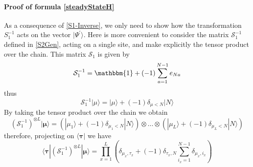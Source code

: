 \documentclass[10pt]{article}
\numberwithin{equation}{section}
\numberwithin{equation}{subsection}
\begin{document}
	\paragraph{Proof of formula \eqref{steadyStateH}} As a consequence of \eqref{S1-Inverse}, we only need to show how the transformation $S_{1}^{-1}$ acts on the vector $|\Psi^{'}\rangle$. Here is more convenient to consider the matrix $\mathcal{S}_{1}^{-1}$ defined in \eqref{S2Gen}, acting on a single site, and make explicitly the tensor product over the chain. This matrix $\mathcal{S}_{1}$ is given by
	\begin{equation}\label{S1-L1}
		\mathcal{S}_{1}^{-1}=\mathbbm{1}+(-1)\sum_{a=1}^{N-1}e_{Na}
	\end{equation}
thus
\begin{equation}
\mathcal{S}_{1}^{-1}|\mu\rangle=|\mu\rangle+(-1)\delta_{\mu<N}|N\rangle
\end{equation}
By taking the tensor product over the chain we obtain 
\begin{equation}
	\left(\mathcal{S}_{1}^{-1}\right)^{\otimes L}|\bm{\mu}\rangle=\left(|\mu_{1}\rangle+(-1)\delta_{\mu_{1}<N}|N\rangle\right)\otimes \ldots \otimes \left(|\mu_{L}\rangle+(-1)\delta_{\mu_{L}<N}|N\rangle\right)
\end{equation}
therefore, projecting on $\langle \bm{\tau}|$ we have
\begin{equation}
	\langle \bm{\tau}|	\left(\mathcal{S}_{1}^{-1}\right)^{\otimes L}|\bm{\mu}\rangle=\prod_{x=1}^{L}\left(\delta_{\mu_{x},\tau_{x}}+(-1)\delta_{\tau_{x},N}\sum_{i_{x}=1}^{N-1}\delta_{\mu_{x},i_{x}}\right)
\end{equation}
\end{document}
